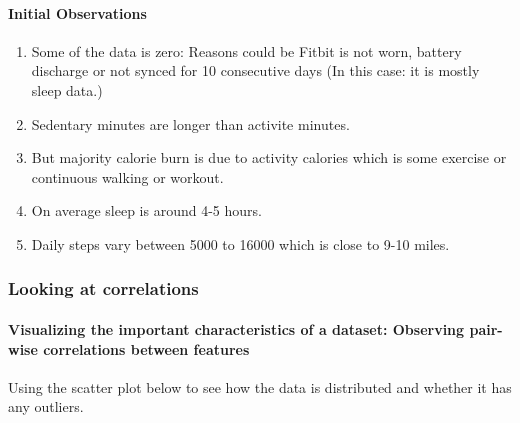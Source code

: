 \documentclass[11pt]{article}
\providecommand{\tightlist}{%
      \setlength{\itemsep}{0pt}\setlength{\parskip}{0pt}}
\begin{document}
    \paragraph{Initial Observations}\label{initial-observations}

    \begin{enumerate}
\def\labelenumi{\arabic{enumi}.}
\tightlist
\item
  Some of the data is zero: Reasons could be Fitbit is not worn, battery
  discharge or not synced for 10 consecutive days (In this case: it is
  mostly sleep data.)
\item
  Sedentary minutes are longer than activite minutes.
\item
  But majority calorie burn is due to activity calories which is some
  exercise or continuous walking or workout.
\item
  On average sleep is around 4-5 hours.
\item
  Daily steps vary between 5000 to 16000 which is close to 9-10 miles.
\end{enumerate}

    \subsubsection{Looking at correlations}\label{looking-at-correlations}

    \paragraph{Visualizing the important characteristics of a dataset:
Observing pair-wise correlations between
features}\label{visualizing-the-important-characteristics-of-a-dataset-observing-pair-wise-correlations-between-features}

    Using the scatter plot below to see how the data is distributed and
whether it has any outliers.
\end{document}
